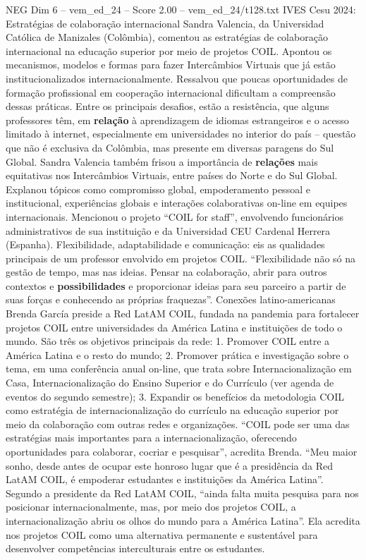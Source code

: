 \begin{textsample}{NEG Dim 6 – vem\_ed\_24 – Score 2.00 – vem\_ed\_24/t128.txt}  \label{ex:f6_neg_104}
IVES Cesu 2024: Estratégias de colaboração internacional Sandra Valencia, da Universidad Católica de Manizales (Colômbia), comentou as estratégias de colaboração internacional na educação superior por meio de projetos COIL.
Apontou os mecanismos, modelos e formas para fazer Intercâmbios Virtuais que já estão institucionalizados internacionalmente.
Ressalvou que poucas oportunidades de formação profissional em cooperação internacional dificultam a compreensão dessas práticas.
Entre os principais desafios, estão a resistência, que alguns professores têm, em \textbf{relação} à aprendizagem de idiomas estrangeiros e o acesso limitado à internet, especialmente em universidades no interior do país – questão que não é exclusiva da Colômbia, mas presente em diversas paragens do Sul Global.
Sandra Valencia também frisou a importância de \textbf{relações} mais equitativas nos Intercâmbios Virtuais, entre países do Norte e do Sul Global.
Explanou tópicos como compromisso global, empoderamento pessoal e institucional, experiências globais e interações colaborativas on-line em equipes internacionais.
Mencionou o projeto “COIL for staff”, envolvendo funcionários administrativos de sua instituição e da Universidad CEU Cardenal Herrera (Espanha).
Flexibilidade, adaptabilidade e comunicação: eis as qualidades principais de um professor envolvido em projetos COIL. “Flexibilidade não só na gestão de tempo, mas nas ideias.
Pensar na colaboração, abrir para outros contextos e \textbf{possibilidades} e proporcionar ideias para seu parceiro a partir de suas forças e conhecendo as próprias fraquezas”.
Conexões latino-americanas Brenda García preside a Red LatAM COIL, fundada na pandemia para fortalecer projetos COIL entre universidades da América Latina e instituições de todo o mundo.
São três os objetivos principais da rede: 1.
Promover COIL entre a América Latina e o resto do mundo; 2.
Promover prática e investigação sobre o tema, em uma conferência anual on-line, que trata sobre Internacionalização em Casa, Internacionalização do Ensino Superior e do Currículo (ver agenda de eventos do segundo semestre); 3.
Expandir os benefícios da metodologia COIL como estratégia de internacionalização do currículo na educação superior por meio da colaboração com outras redes e organizações. “COIL pode ser uma das estratégias mais importantes para a internacionalização, oferecendo oportunidades para colaborar, cocriar e pesquisar”, acredita Brenda. “Meu maior sonho, desde antes de ocupar este honroso lugar que é a presidência da Red LatAM COIL, é empoderar estudantes e instituições da América Latina”.
Segundo a presidente da Red LatAM COIL, “ainda falta muita pesquisa para nos posicionar internacionalmente, mas, por meio dos projetos COIL, a internacionalização abriu os olhos do mundo para a América Latina”.
Ela acredita nos projetos COIL como uma alternativa permanente e sustentável para desenvolver competências interculturais entre os estudantes.

\end{textsample}
